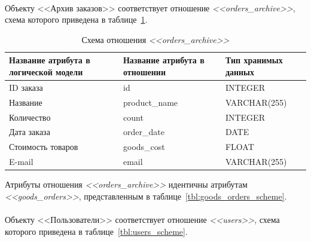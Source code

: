 \paragraph{}
Объекту <<Архив заказов>> соответствует отношение \textit{<<orders\_archive>>}, схема которого приведена в
таблице~\ref{tbl:orders_archive_scheme}.
\begin{table}[h!]
  \caption{Схема отношения \textit{<<orders\_archive>>}}
  \label{tbl:orders_archive_scheme}
  \small{
    \centering
    \begin{tabular}{| p{} | p{} | p{} |}
      \hline
      Название атрибута в \newline логической модели &
      Название атрибута в \newline отношении &
      Тип хранимых данных \\

      \hline
      ID заказа & id & INTEGER \\

      \hline
      Название & product\_name & VARCHAR(255) \\

      \hline
      Количество & count & INTEGER \\

      \hline
      Дата заказа & order\_date & DATE \\

      \hline
      Стоимость товаров & goods\_cost & FLOAT \\

      \hline
      E-mail & email & VARCHAR(255) \\

      \hline
    \end{tabular}
    }
\end{table}

Атрибуты отношения \textit{<<orders\_archive>>} идентичны атрибутам
\textit{<<goods\_orders>>}, представленным в таблице~\ref{tbl:goods_orders_scheme}.

\paragraph{}

Объекту <<Пользователи>> соответствует отношение \textit{<<users>>}, схема которого приведена в
таблице~\ref{tbl:users_scheme}.

